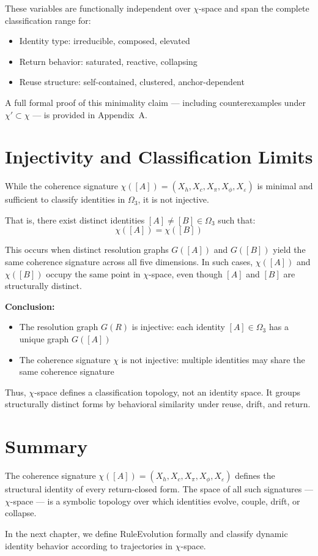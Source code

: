 These variables are functionally independent over $\chi$-space and span the complete classification range for:
\begin{itemize}
  \item Identity type: irreducible, composed, elevated
  \item Return behavior: saturated, reactive, collapsing
  \item Reuse structure: self-contained, clustered, anchor-dependent
\end{itemize}

A full formal proof of this minimality claim — including counterexamples under $\chi' \subset \chi$ — is provided in Appendix~A.

\section{Injectivity and Classification Limits} \label{injectivity-and-classification-limits}

While the coherence signature $\chi([A]) = (X_h, X_c, X_\pi, X_\phi, X_\varepsilon)$ is minimal and sufficient to classify identities in $\Omega_3$, it is not injective.

That is, there exist distinct identities $[A] \ne [B] \in \Omega_3$ such that:
\begin{equation} \label{eq:chi-noninjective}
\chi([A]) = \chi([B])
\end{equation}

This occurs when distinct resolution graphs $G([A])$ and $G([B])$ yield the same coherence signature across all five dimensions.  
In such cases, $\chi([A])$ and $\chi([B])$ occupy the same point in $\chi$-space, even though $[A]$ and $[B]$ are structurally distinct.

\textbf{Conclusion:}
\begin{itemize}
  \item The resolution graph $G(R)$ is injective: each identity $[A] \in \Omega_3$ has a unique graph $G([A])$
  \item The coherence signature $\chi$ is not injective: multiple identities may share the same coherence signature
\end{itemize}

Thus, $\chi$-space defines a classification topology, not an identity space.  
It groups structurally distinct forms by behavioral similarity under reuse, drift, and return.

\section{Summary}

The coherence signature $\chi([A]) = (X_h, X_c, X_\pi, X_\phi, X_\varepsilon)$ defines the structural identity of every return-closed form.  
The space of all such signatures — $\chi$-space — is a symbolic topology over which identities evolve, couple, drift, or collapse.

In the next chapter, we define RuleEvolution formally and classify dynamic identity behavior according to trajectories in $\chi$-space.
